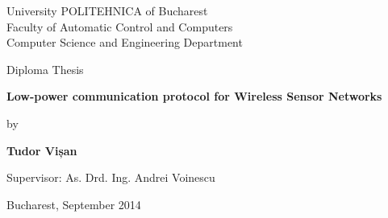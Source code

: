 

\pagestyle{empty}
\sffamily

\noindent
\begin{center}
    \Large
    University POLITEHNICA of Bucharest\\
    Faculty of Automatic Control and Computers \\
    Computer Science and Engineering Department \\
\end{center}

\vfill\vfill
\begin{center}
    \Large
    Diploma Thesis\\
\end{center}

\vfill
\begin{center}
	\HUGE\bfseries
	Low-power communication protocol for Wireless Sensor Networks\\
\vfill
	\large
	
\end{center}

\vfill
\begin{center}
    \Large
    by
\end{center}

\vfill
\begin{center}
    \huge\bfseries
    Tudor Vișan
\end{center}

\vfill\vfill\vfill
\begin{center}
	\Large
	Supervisor: As. Drd. Ing. Andrei Voinescu\\
\end{center}

\vfill
\begin{center}
\large
    Bucharest, September 2014
\end{center}

\cleardoublepage

\pagestyle{headings}
\tableofcontents

